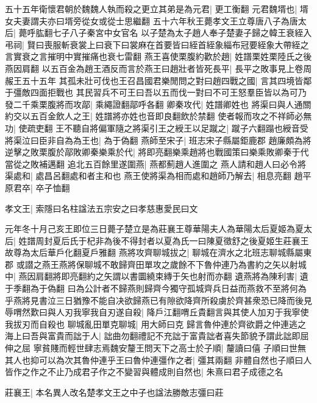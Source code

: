 五十五年衛懷君朝於魏魏人執而殺之更立其弟是為元君|{
	更工衡翻}
元君魏壻也|{
	壻女夫妻謂夫亦曰壻旁從女或從士思繼翻}
五十六年秋王薨孝文王立尊唐八子為唐太后|{
	薨呼肱翻七子八子秦宮中女官名}
以子楚為太子趙人奉子楚妻子歸之韓王衰絰入弔祠|{
	賢曰喪服斬衰裳上曰衰下曰裳麻在首要皆曰絰首絰象緇布冠要絰象大帶絰之言實衰之言摧明中實摧痛也衰七雷翻}
燕王喜使栗腹約歡於趙|{
	姓譜栗姓栗陸氏之後燕因肩翻}
以五百金為趙王酒反而言於燕王曰趙壯者皆死長平|{
	長平之敗事見上卷周赧王五十五年}
其孤未壯可伐也王召昌國君樂閒問之對曰趙四戰之國|{
	言其四境皆鄰于彊敵四面拒戰也}
其民習兵不可王曰吾以五而伐一對曰不可王怒羣臣皆以為可乃發二千乘栗腹將而攻鄗|{
	乘繩證翻鄗呼各翻}
卿秦攻代|{
	姓譜卿姓也}
將渠曰與人通關約交以五百金飲人之王|{
	姓譜將亦姓也音即良翻飲於禁翻}
使者報而攻之不祥師必無功|{
	使疏吏翻}
王不聽自將偏軍隨之將渠引王之綬王以足蹴之|{
	蹴子六翻蹋也綬音受}
將渠泣曰臣非自為為王也|{
	為于偽翻}
燕師至宋子|{
	班志宋子縣屬鉅鹿郡}
趙廉頗為將逆擊之敗栗腹於鄗敗卿秦樂乘於代|{
	將即亮翻樂乘趙將也戰國策曰樂乘敗卿秦于代當從之敗補邁翻}
追北五百餘里遂圍燕|{
	燕都薊趙人進圍之}
燕人請和趙人曰必令將渠處和|{
	處昌呂翻處和者主和也}
燕王使將渠為相而處和趙師乃解去|{
	相息亮翻}
趙平原君卒|{
	卒子恤翻}


孝文王|{
	索隱曰名柱諡法五宗安之曰孝慈惠愛民曰文}


元年冬十月己亥王即位三日薨子楚立是為莊襄王尊華陽夫人為華陽太后夏姬為夏太后|{
	姓譜周封夏后氏于杞非為後不得封者以夏為氏一曰陳夏徵舒之後夏姬生莊襄王故尊為太后華戶化翻夏戶雅翻}
燕將攻齊聊城拔之|{
	聊城在濟水之北班志聊城縣屬東郡}
或譛之燕王燕將保聊城不敢歸齊田單攻之歲餘不下魯仲連乃為書約之矢以射城中|{
	燕因肩翻將即亮翻約之矢謂以書圜繞束縳于矢也射而亦翻}
遺燕將為陳利害|{
	遺于季翻為于偽翻}
曰為公計者不歸燕則歸齊今獨守孤城齊兵日益而燕救不至將何為乎燕將見書泣三日猶豫不能自决欲歸燕已有隙欲降齊所殺虜於齊甚衆恐已降而後見辱喟然歎曰與人刃我寧我自刃遂自殺|{
	降戶江翻喟丘貴翻言與其使人加刃于我寧使我拔刃而自殺也}
聊城亂田單克聊城|{
	用大師曰克}
歸言魯仲連於齊欲爵之仲連逃之海上曰吾與富貴而詘于人|{
	詘曲勿翻禮記不充詘于富貴詘者喜失節貌予謂此詘即屈伸之屈}
寧貧賤而輕世肆志焉魏安釐王問天下之高士於子順|{
	釐讀曰僖}
子順曰世無其人也抑可以為次其魯仲連乎王曰魯仲連彊作之者|{
	彊其兩翻}
非體自然也子順曰人皆作之作之不止乃成君子作之不變習與體成則自然也|{
	朱熹曰君子成德之名}


莊襄王|{
	本名異人改名楚孝文王之中子也諡法勝敵志彊曰莊}



